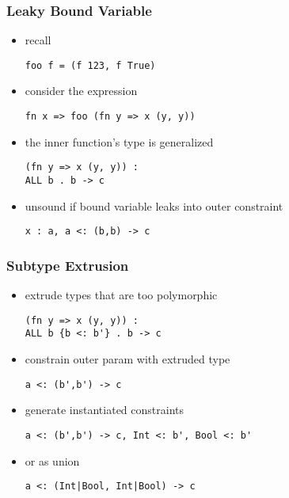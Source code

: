 \documentclass{beamer}
\begin{document}
\begin{frame}[fragile]
  \frametitle{Leaky Bound Variable}


  \begin{itemize}
  \item recall 
  \begin{lstlisting}
foo f = (f 123, f True)
  \end{lstlisting}
  \item consider the expression 
  \begin{lstlisting}
fn x => foo (fn y => x (y, y))
  \end{lstlisting}
  \item the inner function's type is generalized 
  \begin{lstlisting}
(fn y => x (y, y)) : 
ALL b . b -> c 
  \end{lstlisting}
  \item unsound if bound variable leaks into outer constraint 
  \begin{lstlisting}
x : a, a <: (b,b) -> c 
  \end{lstlisting}
  \end{itemize}
\end{frame}

\begin{frame}[fragile]
  \frametitle{Subtype Extrusion}

  \begin{itemize}
  \item extrude types that are too polymorphic
  \begin{lstlisting}
(fn y => x (y, y)) : 
ALL b {b <: b'} . b -> c 
  \end{lstlisting}
  \item constrain outer param with extruded type  
  \begin{lstlisting}
a <: (b',b') -> c
  \end{lstlisting}
  \item generate instantiated constraints 
  \begin{lstlisting}
a <: (b',b') -> c, Int <: b', Bool <: b' 
  \end{lstlisting}
  \item or as union 
  \begin{lstlisting}
a <: (Int|Bool, Int|Bool) -> c
  \end{lstlisting}
  \end{itemize}
\end{frame}
\end{document}
